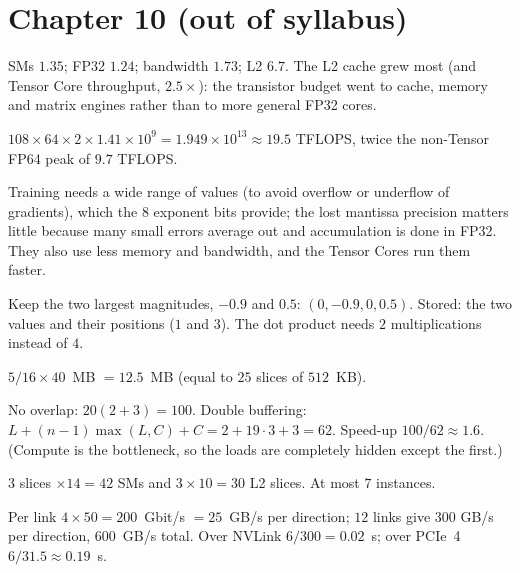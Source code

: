 \section*{Chapter 10 (out of syllabus)}
\begin{description}[leftmargin=1.2cm,labelwidth=1cm,itemsep=3pt]
  \item[10.1] SMs $1.35$; FP32 $1.24$; bandwidth $1.73$; L2 $6.7$. The L2 cache grew most (and Tensor Core throughput, $2.5\times$): the transistor budget went to cache, memory and matrix engines rather than to more general FP32 cores.
  \item[10.2] $108\times64\times2\times1.41\times10^{9}=1.949\times10^{13}\approx19.5$ TFLOPS, twice the non-Tensor FP64 peak of $9.7$ TFLOPS.
  \item[10.3] Training needs a wide range of values (to avoid overflow or underflow of gradients), which the $8$ exponent bits provide; the lost mantissa precision matters little because many small errors average out and accumulation is done in FP32. They also use less memory and bandwidth, and the Tensor Cores run them faster.
  \item[10.4] Keep the two largest magnitudes, $-0.9$ and $0.5$: $(0,-0.9,0,0.5)$. Stored: the two values and their positions ($1$ and $3$). The dot product needs $2$ multiplications instead of $4$.
  \item[10.5] $5/16\times40$~MB $=12.5$~MB (equal to $25$ slices of $512$~KB).
  \item[10.6] No overlap: $20(2+3)=100$. Double buffering: $L+(n-1)\max(L,C)+C=2+19\cdot3+3=62$. Speed-up $100/62\approx1.6$. (Compute is the bottleneck, so the loads are completely hidden except the first.)
  \item[10.7] $3$ slices $\times14=42$ SMs and $3\times10=30$ L2 slices. At most $7$ instances.
  \item[10.8] Per link $4\times50=200$~Gbit/s $=25$~GB/s per direction; $12$ links give $300$ GB/s per direction, $600$~GB/s total. Over NVLink $6/300=0.02$~s; over PCIe~4 $6/31.5\approx0.19$~s.
\end{description}
